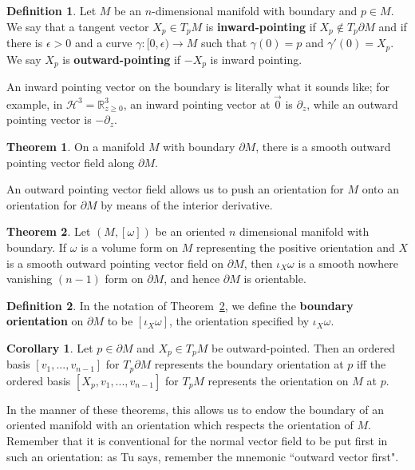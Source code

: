 \documentclass[11pt, oneside]{article}   	%
\theoremstyle{definition}
\newtheorem{definition}{Definition}[section]
\newtheorem{theorem}{Theorem}[section]
\newtheorem{corollary}{Corollary}[theorem]
\begin{document}
\begin{definition}
	Let $M$ be an $n$-dimensional manifold with boundary and $p\in M$. We say that a tangent vector $X_p\in T_p M$ is 
	\textbf{inward-pointing} if $X_p\not\in T_p\partial M$ and if there is $\epsilon > 0$ and a curve $\gamma : [0, \epsilon)
	\rightarrow M$ such that $\gamma(0) = p$ and $\gamma'(0) = X_p$. We say $X_p$ is \textbf{outward-pointing} if 
	$-X_p$ is inward pointing. 
\end{definition}
An inward pointing vector on the boundary is literally what it sounds like; for example, in $\mathcal H^3 = \mathbb R^3_{z\geq 
0}$, an inward pointing vector at $\vec 0$ is $\partial_z$, while an outward pointing vector is $-\partial_z$. 
\begin{theorem}
	On a manifold $M$ with boundary $\partial M$, there is a smooth outward pointing vector field along $\partial M$. 
\end{theorem}
An outward pointing vector field allows us to push an orientation for $M$ onto an orientation for $\partial M$ by means 
of the interior derivative. 
\begin{theorem}
	Let $(M, [\omega])$ be an oriented $n$ dimensional manifold with boundary. If $\omega$ is a volume form on $M$ 
	representing the positive orientation and $X$ is a 
	smooth outward pointing vector field on $\partial M$, then $\iota_X\omega$ is a smooth nowhere vanishing $(n - 1)$ 
	form on $\partial M$, and hence $\partial M$ is orientable. ~
	\label{thm:boundary}
\end{theorem}
\begin{definition}
	In the notation of Theorem~\ref{thm:boundary}, we define the \textbf{boundary orientation} on $\partial M$ to 
	be $[\iota_X\omega]$, the orientation specified by $\iota_X\omega$. 
\end{definition}
\begin{corollary}
	Let $p\in\partial M$ and $X_p\in T_p M$ be outward-pointed. Then an ordered basis $[v_1, ..., v_{n - 1}]$ for $T_p
	\partial M$ represents the boundary orientation at $p$ iff the ordered basis $[X_p, v_1, ..., v_{n - 1}]$ for $T_p M$ 
	represents the orientation on $M$ at $p$. 
\end{corollary}
In the manner of these theorems, this allows us to endow the boundary of an oriented manifold with an orientation which 
respects the orientation of $M$. Remember that it is conventional for the normal vector field to be put first in such an 
orientation: as Tu says, remember the mnemonic ``outward vector first". 
\end{document}
